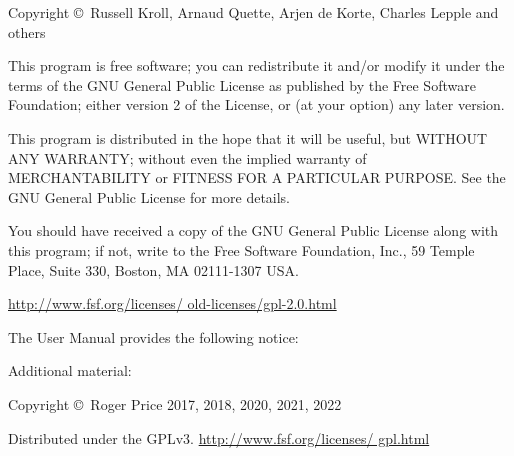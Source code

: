 \documentclass[12pt]{article}
\begin{document}
\vspace{5mm}

\textsf{Copyright \copyright\ Russell Kroll, Arnaud Quette, Arjen de Korte,
  Charles Lepple and others}

\vspace{5mm}

\textsf{This program is free software; you can redistribute it and/or modify
  it under the terms of the GNU General Public License as published by the
  Free Software Foundation; either version 2 of the License, or (at your
  option) any later version.}

\textsf{This program is distributed in the hope that it will be useful, but
  WITHOUT ANY WARRANTY; without even the implied warranty of MERCHANTABILITY
  or FITNESS FOR A PARTICULAR PURPOSE.  See the GNU General Public License for
  more details.}

\textsf{You should have received a copy of the GNU General Public License
  along with this program; if not, write to the Free Software Foundation,
  Inc., 59 Temple Place, Suite 330, Boston, MA 02111-1307 USA.}
  
\href{http://www.fsf.org/licenses/old-licenses/gpl-2.0.html}
     {http://{\allowbreak}www.fsf.org/{\allowbreak}licenses/%
       {\allowbreak}old-licenses/{\allowbreak}gpl-2.0.html}

\vspace*{\fill}

The User Manual provides the following notice: 


\vspace*{\fill}

Additional material:

\textsf{Copyright \copyright\ Roger Price 2017, 2018, 2020, 2021, 2022}

\textsf{Distributed under the GPLv3.}
\href{http://www.fsf.org/licenses/gpl.html}
     {http://{\allowbreak}www.fsf.org/{\allowbreak}licenses/%
       {\allowbreak}gpl.html}
\end{document}
